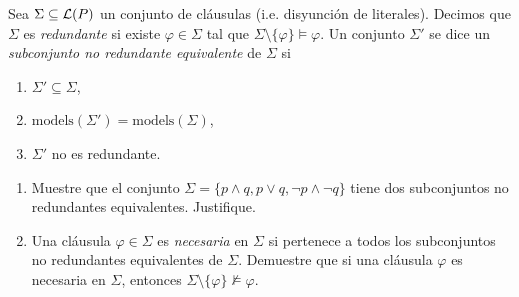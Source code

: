 
Sea $\Sigma\subseteq\mathcal{L}(P)$ un conjunto de cláusulas (i.e. disyunción de literales). Decimos que $\Sigma$ es \textit{redundante} si existe $\varphi\in\Sigma$ tal que $\Sigma\setminus\{\varphi\}\models\varphi$. Un conjunto $\Sigma'$ se dice un \textit{subconjunto no redundante equivalente} de $\Sigma$ si 
\begin{enumerate}
    \item $\Sigma'\subseteq\Sigma$,
    \item $\text{models}(\Sigma')=\text{models}(\Sigma)$,
    \item $\Sigma'$ no es redundante.
\end{enumerate}
\begin{enumerate}[label=(\alph*)]
    \item Muestre que el conjunto $\Sigma=\{p\wedge q,p\vee q, \neg p\wedge\neg q\}$ tiene dos subconjuntos no redundantes equivalentes. Justifique.
    \item Una cláusula $\varphi\in\Sigma$ es \textit{necesaria} en $\Sigma$ si pertenece a todos los subconjuntos no redundantes equivalentes de $\Sigma$. Demuestre que si una cláusula $\varphi$ es necesaria en $\Sigma$, entonces $\Sigma\setminus\{\varphi\}\not\models\varphi.$ %
\end{enumerate}

